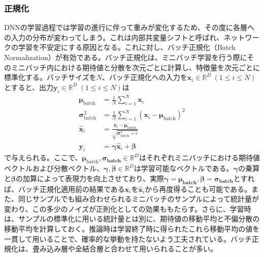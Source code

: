 \documentclass[12pt]{jarticle}
\numberwithin{equation}{section}    %
\numberwithin{figure}{section}      %
\numberwithin{table}{section}      %
\begin{document}
\subsubsection{正規化}
DNNの学習過程では学習の進行に伴って重みが変化するため、その度に各層への入力の分布が変わってしまう。これは内部共変量シフトと呼ばれ、ネットワークの学習を不安定にする原因となる。これに対し、バッチ正規化（Batch Normalization）\cite{ioffe2015batch}が有効である。バッチ正規化は、ミニバッチ学習を行う際にそのミニバッチ内における期待値と分散を次元ごとに計算し、特徴量を次元ごとに標準化する。バッチサイズを$N$、バッチ正規化への入力を$\bm{x}_{i} \in \mathbb{R}^{D} ~ (1 \le i \le N)$とすると、出力$\bm{y}_{i} \in \mathbb{R}^{D} ~ (1 \le i \le N)$は
\begin{align}
    \bm{\mu}_{\text{batch}}        & = \frac{1}{N} \sum_{i = 1}^{N} \bm{x}_{i}                                                       \\
    \bm{\sigma}_{\text{batch}}^{2} & = \frac{1}{N} \sum_{i = 1}^{N} (\bm{x}_{i} - \bm{\mu}_{\text{batch}})^{2}                       \\
    \hat{\bm{x}}_{i}               & = \frac{\bm{x}_{i} - \bm{\mu}_{\text{batch}}}{\sqrt{\bm{\sigma}_{\text{batch}}^{2} + \epsilon}} \\
    \bm{y}_{i}                     & = \bm{\gamma} \hat{\bm{x}}_{i} + \bm{\beta}
\end{align}
で与えられる。ここで、$\bm{\mu}_{\text{batch}}, \bm{\sigma_{\text{batch}}} \in \mathbb{R}^{D}$はそれぞれミニバッチにおける期待値ベクトルおよび分散ベクトル、$\bm{\gamma}, \bm{\beta} \in \mathbb{R}^{D}$は学習可能なベクトルである。$\bm{\gamma}$の乗算と$\bm{\beta}$の加算によって表現力を向上させており、実際$\bm{\gamma} = \bm{\mu_{\text{batch}}}, \bm{\beta} = \bm{\sigma_{\text{batch}}}$とすれば、バッチ正規化適用前の結果である$\bm{x}_{i}$を$\hat{\bm{x}}_{i}$から再度得ることも可能である。また、同じサンプルでも組み合わせられるミニバッチのサンプルによって統計量が変わり、この多少のノイズが正則化としての効果ももたらす。さらに、学習時は、サンプルの標準化に用いる統計量とは別に、期待値の移動平均と不偏分散の移動平均を計算しておく。推論時は学習終了時に得られたこれら移動平均の値を一貫して用いることで、確率的な挙動を持たないよう工夫されている。バッチ正規化は、畳み込み層や全結合層と合わせて用いられることが多い。
\end{document}
